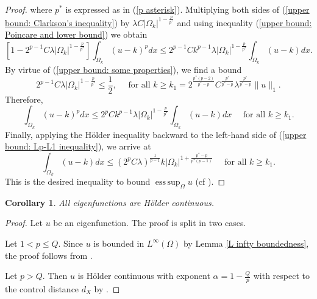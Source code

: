 \documentclass[a4paper,12pt,reqno]{amsart}
\renewcommand\eqref[1]{(\ref{#1})} %
\numberwithin{equation}{section}
\theoremstyle{plain}
\newtheorem{cor}[thm]{Corollary}
\theoremstyle{definition}
\DeclareMathOperator*{\esssup}{ess\,sup}
\begin{document}
\begin{proof}
where $p^{*}$ is expressed as in \eqref{p asterisk}. Multiplying both sides of \eqref{upper bound: Clarkson's inequality} by $\lambda  C \left|\Omega_{k}\right|^{1-\frac{p}{p^{*}}}$ and using inequality \eqref{upper bound: Poincare and lower bound} we obtain
\begin{equation*}
\left[1-2^{p-1}C \lambda\left|\Omega_{k}\right|^{1-\frac{p}{p^{*}}}\right] \int_{\Omega_{k}}(u-k)^{p} d x \leq 2^{p-1}Ck^{p-1} \lambda\left|\Omega_{k}\right|^{1-\frac{p}{p^{*}}} \int_{\Omega_{k}}(u-k) d x .
\end{equation*}
By virtue of \eqref{upper bound: some properties}, we find a bound
\begin{equation*}
2^{p-1}C \lambda\left|\Omega_{k}\right|^{1-\frac{p}{p^{*}}} \leq \frac{1}{2}, \quad \text{ for all }    k \geq k_{1}=2^{\frac{p^{*}(p-2)}{ p^{*}-p}}C^{{\frac{p^{*}}{ p^{*}-p}}} \lambda^{{\frac{p^{*}}{ p^{*}-p}}}\|u\|_{1}.
\end{equation*}
Therefore,
\begin{equation}\label{upper bound: Lp-L1 inequality}
\int_{\Omega_{k}}(u-k)^{p} d x \leq 2^{p}C k^{p-1} \lambda\left|\Omega_{k}\right|^{1-\frac{p}{p^{*}}} \int_{\Omega_{k}}(u-k) d x  \quad \text{ for all } k \geq k_{1}.
\end{equation}
Finally, applying the H\"older inequality backward to the left-hand side of \eqref{upper bound: Lp-L1 inequality}, we arrive at
\begin{equation*}
\int_{\Omega_{k}}(u-k) d x \leq  (2^{p}C\lambda)^{\frac{1}{p-1}} k\left|\Omega_{k}\right|^{1+\frac{p^{*}-p}{p^{*}(p-1)}} \quad \text{ for all } k \geq k_{1}.  
\end{equation*}
This is the desired inequality to bound $\esssup_{\Omega}u$ (cf \cite{Lin1992}).
\end{proof}

\begin{cor}\label{Holder continuity}
All eigenfunctions  are H\"older continuous.
\end{cor}
\begin{proof}
Let $u$ be an eigenfunction. The proof is split in two cases.

Let $1<p\leq Q$. Since $u$ is bounded in $L^{\infty}(\Omega)$ by Lemma \ref{L infty boundedness}, the proof follows from \cite[Theorem 6.6]{DGN1998}.

Let $p>Q$. Then $u$ is  H\"older continuous with exponent $\alpha=1-\frac{Q}{p}$ with respect to the control distance $d_{X}$  by \cite[Theorem 1.11]{GN1996}.
\end{proof}
\end{document}
